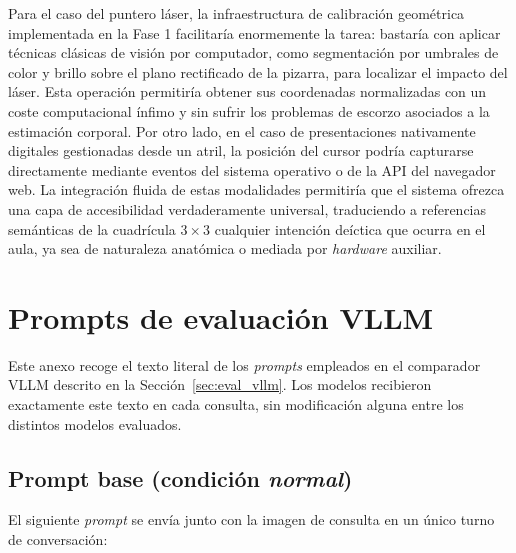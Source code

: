 \documentclass[12pt]{report} %
\begin{document}
Para el caso del puntero láser, la infraestructura de calibración geométrica implementada en la Fase 1 facilitaría enormemente la tarea: bastaría con aplicar técnicas clásicas de visión por computador, como segmentación por umbrales de color y brillo sobre el plano rectificado de la pizarra, para localizar el impacto del láser. Esta operación permitiría obtener sus coordenadas normalizadas con un coste computacional ínfimo y sin sufrir los problemas de escorzo asociados a la estimación corporal. Por otro lado, en el caso de presentaciones nativamente digitales gestionadas desde un atril, la posición del cursor podría capturarse directamente mediante eventos del sistema operativo o de la API del navegador web. La integración fluida de estas modalidades permitiría que el sistema ofrezca una capa de accesibilidad verdaderamente universal, traduciendo a referencias semánticas de la cuadrícula $3 \times 3$ cualquier intención deíctica que ocurra en el aula, ya sea de naturaleza anatómica o mediada por \textit{hardware} auxiliar.


\clearpage
{}
\printbibliography



\appendix

\chapter{Prompts de evaluación VLLM}
\label{chap:prompts}

Este anexo recoge el texto literal de los \textit{prompts} empleados en el comparador VLLM descrito en la Sección~\ref{sec:eval_vllm}. Los modelos recibieron exactamente este texto en cada consulta, sin modificación alguna entre los distintos modelos evaluados.

\section{Prompt base (condición \textit{normal})}
\label{sec:prompt_normal}

El siguiente \textit{prompt} se envía junto con la imagen de consulta en un único turno de conversación:
\end{document}
